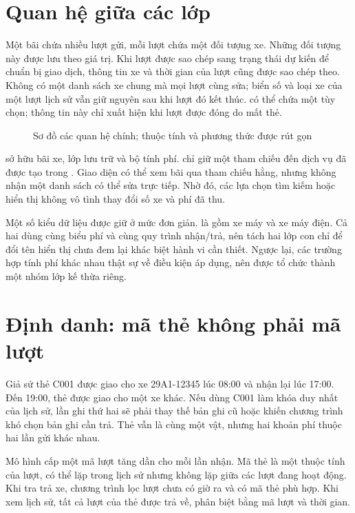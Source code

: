 \section{Quan hệ giữa các lớp}
Một bãi chứa nhiều lượt gửi, mỗi lượt chứa một đối tượng xe. Những đối tượng này được lưu theo giá trị. Khi lượt được sao chép sang trạng thái dự kiến để chuẩn bị giao dịch, thông tin xe và thời gian của lượt cũng được sao chép theo. Không có một danh sách xe chung mà mọi lượt cùng sửa; biển số và loại xe của một lượt lịch sử vẫn giữ nguyên sau khi lượt đó kết thúc.  có thể chứa một  tùy chọn; thông tin này chỉ xuất hiện khi lượt được đóng do mất thẻ.

\begin{figure}[H]
\centering

\caption{Sơ đồ các quan hệ chính; thuộc tính và phương thức được rút gọn}
\label{fig:domain}
\end{figure}

 sở hữu bãi xe, lớp lưu trữ và bộ tính phí.  chỉ giữ một tham chiếu đến dịch vụ đã được tạo trong . Giao diện có thể xem bãi qua tham chiếu hằng, nhưng không nhận một danh sách có thể sửa trực tiếp. Nhờ đó, các lựa chọn tìm kiếm hoặc hiển thị không vô tình thay đổi số xe và phí đã thu.

Một số kiểu dữ liệu được giữ ở mức đơn giản.  là  gồm xe máy và xe máy điện. Cả hai dùng cùng biểu phí và cùng quy trình nhận/trả, nên tách hai lớp con chỉ để đổi tên hiển thị chưa đem lại khác biệt hành vi cần thiết. Ngược lại, các trường hợp tính phí khác nhau thật sự về điều kiện áp dụng, nên được tổ chức thành một nhóm lớp kế thừa riêng.

\section{Định danh: mã thẻ không phải mã lượt}
Giả sử thẻ C001 được giao cho xe 29A1-12345 lúc 08:00 và nhận lại lúc 17:00. Đến 19:00, thẻ được giao cho một xe khác. Nếu dùng C001 làm khóa duy nhất của lịch sử, lần ghi thứ hai sẽ phải thay thế bản ghi cũ hoặc khiến chương trình khó chọn bản ghi cần trả. Thẻ vẫn là cùng một vật, nhưng hai khoản phí thuộc hai lần gửi khác nhau.

Mô hình cấp một mã lượt tăng dần cho mỗi lần nhận. Mã thẻ là một thuộc tính của lượt, có thể lặp trong lịch sử nhưng không lặp giữa các lượt đang hoạt động. Khi tra trả xe, chương trình lọc lượt chưa có giờ ra và có mã thẻ phù hợp. Khi xem lịch sử, tất cả lượt của thẻ được trả về, phân biệt bằng mã lượt và thời gian.

